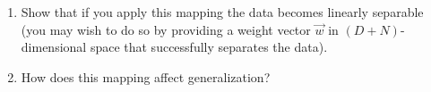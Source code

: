 \documentclass{article}
\begin{document}
\begin{enumerate}
\begin{enumerate}
\item Show that if you apply this mapping the data becomes
  linearly separable (you may wish to do so by providing a weight
  vector $\vec w$ in $(D+N)$-dimensional space that successfully
  separates the data).

\item How does this mapping affect generalization?


\end{enumerate}
\end{enumerate}
\end{document}
